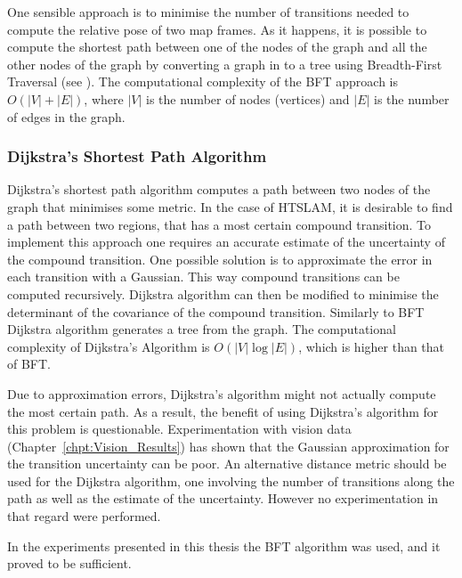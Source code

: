 One sensible approach is to minimise the number of transitions needed
to compute the relative pose of two map frames. As it happens, it
is possible to compute the shortest path between one of the nodes of
the graph and all the other nodes of the graph by converting a graph
in to a tree using Breadth-First Traversal (see ).
The computational complexity of the BFT approach is $O(|V| + |E|)$,
where $|V|$ is the number of nodes (vertices) and $|E|$ is the number of
edges in the graph.


\subsubsection{Dijkstra's Shortest Path Algorithm}


Dijkstra's shortest path algorithm computes a path between two nodes
of the graph that minimises some metric. In the case of HTSLAM, it is
desirable to find a path between two regions, that has a most certain
compound transition. To implement this approach one requires an
accurate estimate of the uncertainty of the compound transition.  One
possible solution is to approximate the error in each transition with
a Gaussian. This way compound transitions can be computed
recursively. Dijkstra algorithm can then be modified to minimise the
determinant of the covariance of the compound transition. Similarly to
BFT Dijkstra algorithm generates a tree from the graph. The
computational complexity of Dijkstra's Algorithm is $O(|V| \log |E|)$,
which is higher than that of BFT.

Due to approximation errors, Dijkstra's algorithm might not actually
compute the most certain path. As a result, the benefit of using
Dijkstra's algorithm for this problem is questionable. Experimentation
with vision data (Chapter~\ref{chpt:Vision_Results}) has shown that
the Gaussian approximation for the transition uncertainty can be poor.
An alternative distance metric should be used for the Dijkstra
algorithm, one involving the number of transitions along the path as well
as the estimate of the uncertainty. However no experimentation in that
regard were performed.

In the experiments presented in this thesis the BFT algorithm was
used, and it proved to be sufficient.





